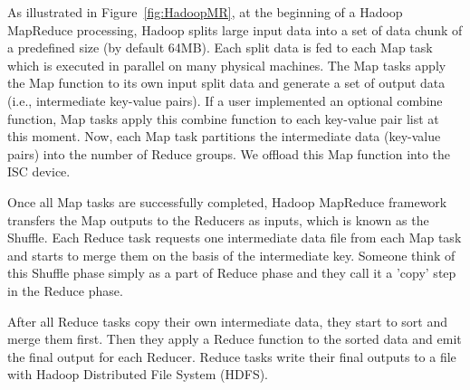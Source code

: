 As illustrated in Figure~\ref{fig:HadoopMR}, at the beginning of a Hadoop MapReduce processing, Hadoop splits large input data into a set of data chunk of a predefined size (by default 64MB). Each split data is fed to each Map task which is executed in parallel on many physical machines. The Map tasks apply the Map function to its own input split data and generate a set of output data (i.e., intermediate key-value pairs). If a user implemented an optional combine function, Map tasks apply this combine function to each key-value pair list at this moment. Now, each Map task partitions the intermediate data (key-value pairs) into the number of Reduce groups. 
We offload this Map function into the ISC device.

Once all Map tasks are successfully completed, Hadoop MapReduce framework transfers the Map outputs to the Reducers as inputs, which is known as the Shuffle. Each Reduce task requests one intermediate data file from each Map task and starts to merge them on the basis of the intermediate key. Someone think of this Shuffle phase simply as a part of Reduce phase and they call it a 'copy' step in the Reduce phase.

After all Reduce tasks copy their own intermediate data, they start to sort and merge them first. Then they apply a Reduce function to the sorted data and emit the final output for each Reducer. Reduce tasks write their final outputs to a file with Hadoop Distributed File System (HDFS).








